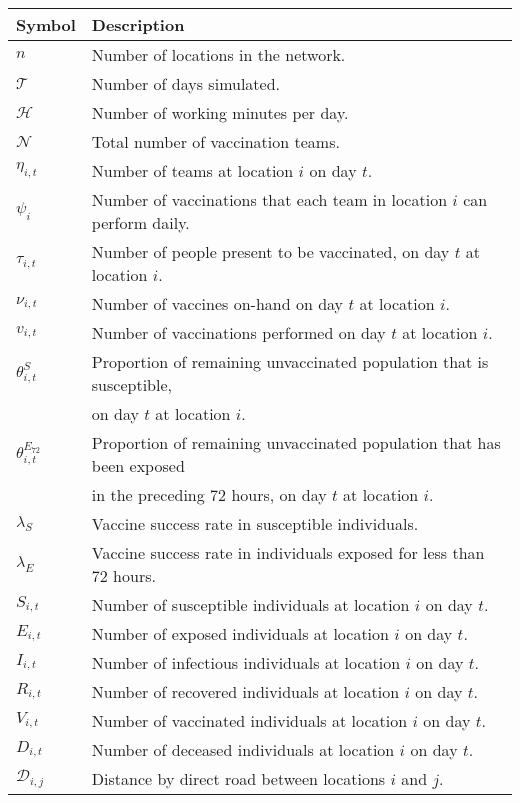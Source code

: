 \documentclass[11pt]{book}
\begin{document}
\listofsymbols
\begin{longtable}[c]{ll}
Symbol & Description \\ \hline
\endfirsthead
%
\endhead
%
$n$ & Number of locations in the network. \\
$\mathcal{T}$ & Number of days simulated. \\
$\mathcal{H}$ & Number of working minutes per day. \\
$\mathcal{N}$ & Total number of vaccination teams. \\
$\eta_{i,t}$ & Number of teams at location $i$ on day $t$. \\
$\psi_{i}$ & Number of vaccinations that each team in location $i$ can perform daily. \\
$\tau_{i,t}$ & Number of people present to be vaccinated, on day $t$ at location $i$. \\
$\nu_{i,t}$ & Number of vaccines on-hand on day $t$ at location $i$. \\
$v_{i,t}$ & Number of vaccinations performed on day $t$ at location $i$. \\
$\theta^{S}_{i,t}$ & Proportion of remaining unvaccinated population that is susceptible, \\ &on day $t$ at location $i$. \\
$\theta^{E_{72}}_{i,t}$ & Proportion of remaining unvaccinated population that has been exposed \\ &in the preceding 72 hours, on day $t$ at location $i$. \\
$\lambda_{S}$ & Vaccine success rate in susceptible individuals. \\
$\lambda_{E}$ & Vaccine success rate in individuals exposed for less than 72 hours. \\
$S_{i,t}$ & Number of susceptible individuals at location $i$ on day $t$. \\
$E_{i,t}$ & Number of exposed individuals at location $i$ on day $t$. \\
$I_{i,t}$ & Number of infectious individuals at location $i$ on day $t$. \\
$R_{i,t}$ & Number of recovered individuals at location $i$ on day $t$. \\
$V_{i,t}$ & Number of vaccinated individuals at location $i$ on day $t$. \\
$D_{i,t}$ & Number of deceased individuals at location $i$ on day $t$. \\
$\mathcal{D}_{i,j}$ & Distance by direct road between locations $i$ and $j$. \\

\end{longtable}
\end{document}
